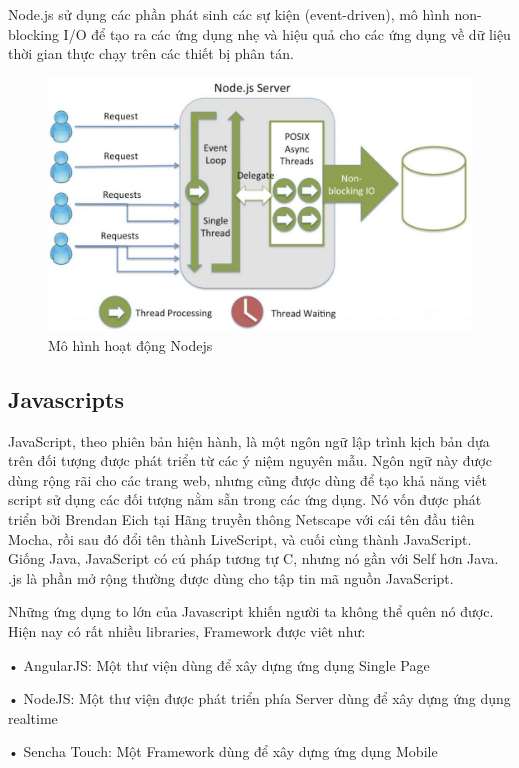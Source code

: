 Node.js sử dụng các phần phát sinh các sự kiện (event-driven), mô hình non-blocking I/O để tạo ra các ứng dụng nhẹ và hiệu quả cho các ứng dụng về dữ liệu thời gian thực chạy trên các thiết bị phân tán.

\begin{figure}[H]
	\centering    
	\includegraphics[width=1.0\textwidth]{nodejs1}
	\caption[Mô hình hoạt động Nodejs]{Mô hình hoạt động Nodejs}
	\label{fig: nodejs1}
\end{figure}

\subsection{Javascripts}
JavaScript, theo phiên bản hiện hành, là một ngôn ngữ lập trình kịch bản dựa trên đối tượng được phát triển từ các ý niệm nguyên mẫu. Ngôn ngữ này được dùng rộng rãi cho các trang web, nhưng cũng được dùng để tạo khả năng viết script sử dụng các đối tượng nằm sẵn trong các ứng dụng. Nó vốn được phát triển bởi Brendan Eich tại Hãng truyền thông Netscape với cái tên đầu tiên Mocha, rồi sau đó đổi tên thành LiveScript, và cuối cùng thành JavaScript. Giống Java, JavaScript có cú pháp tương tự C, nhưng nó gần với Self hơn Java. .js là phần mở rộng thường được dùng cho tập tin mã nguồn JavaScript.\cite{c2js}

Những ứng dụng to lớn của Javascript khiến người ta không thể quên nó được. Hiện nay có rất nhiều libraries, Framework được viêt như: \cite{c2js2}

• AngularJS: Một thư viện dùng để xây dựng ứng dụng Single Page

• NodeJS: Một thư viện được phát triển phía Server dùng để xây dựng ứng dụng realtime

• Sencha Touch: Một Framework  dùng để xây dựng ứng dụng Mobile

